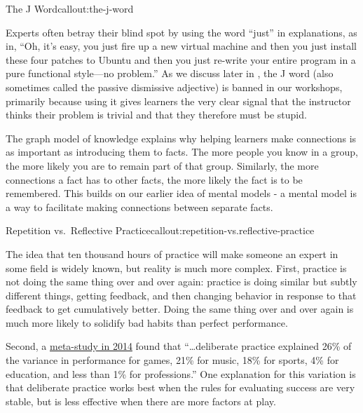 \begin{callout}{The J Word}{callout:the-j-word}

Experts often betray their blind spot by using the word ``just'' in
explanations, as in, ``Oh, it's easy, you just fire up a new virtual
machine and then you just install these four patches to Ubuntu and then
you just re-write your entire program in a pure functional style---no
problem.'' As we discuss later in ,
the J word (also sometimes called the passive dismissive
adjective) is banned in our workshops, primarily because using it gives
learners the very clear signal that the instructor thinks their problem
is trivial and that they therefore must be stupid.
\end{callout}

The graph model of knowledge explains why helping learners make
connections is as important as introducing them to facts. The more
people you know in a group, the more likely you are to remain part of
that group. Similarly, the more connections a fact has to other facts,
the more likely the fact is to be remembered. This builds on our earlier
idea of mental models - a mental model is a way to facilitate making
connections between separate facts.

\begin{callout}{Repetition vs.~Reflective Practice}{callout:repetition-vs.reflective-practice}

The idea that ten thousand hours of practice will make someone an expert
in some field is widely known, but reality is much more complex. First,
practice is not doing the same thing over and over again: practice is
doing similar but subtly different things, getting feedback, and then
changing behavior in response to that feedback to get cumulatively
better. Doing the same thing over and over again is much more likely to
solidify bad habits than perfect performance.

Second, a \href{http://pss.sagepub.com/content/25/8/1608}{meta-study in
2014} found that ``\ldots{}deliberate practice explained 26\% of the
variance in performance for games, 21\% for music, 18\% for sports, 4\%
for education, and less than 1\% for professions.'' One explanation for
this variation is that deliberate practice works best when the rules for
evaluating success are very stable, but is less effective when there are
more factors at play.
\end{callout}


